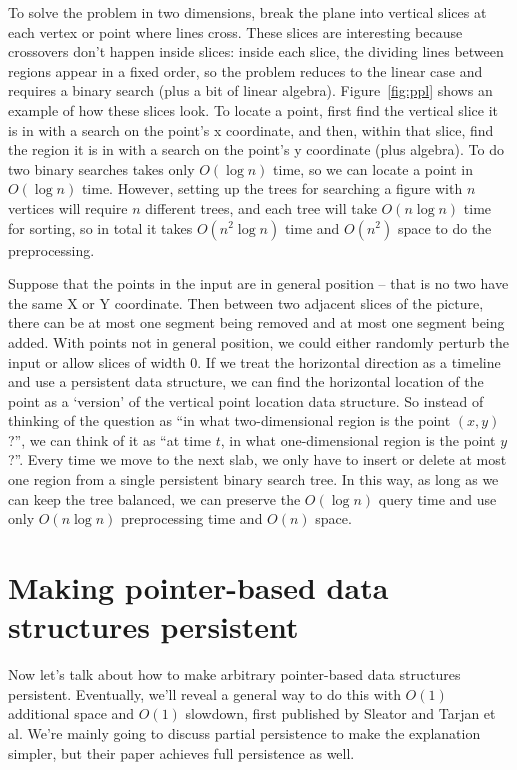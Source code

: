 \documentclass{article}
\begin{document}
To solve the problem in two dimensions, break the plane into vertical
slices at each vertex or point where lines cross. These slices are
interesting because crossovers don't happen inside slices: inside each
slice, the dividing lines between regions appear in a fixed order, so
the problem reduces to the linear case and requires a binary search
(plus a bit of linear algebra).  Figure~\ref{fig:ppl} shows an example
of how these slices look. To locate a point, first find the vertical
slice it is in with a search on the point's x coordinate, and then,
within that slice, find the region it is in with a search on the
point's y coordinate (plus algebra). To do two binary searches takes
only $O(\log n)$ time, so we can locate a point in $ O(\log n)$ time.
However, setting up the trees for searching a figure with $n$ vertices
will require $n$ different trees, and each tree will take
$O(n\log n)$ time for sorting, so in total it takes $O(n^2 \log n)$ time and
$O(n^2)$ space to do the preprocessing.

Suppose that the points in the input are in general position -- that is 
no two have the same X or Y coordinate. Then between two adjacent slices
of the picture, there can be at most one segment being removed and at most
one segment being added. With points not in general position, we could either
randomly perturb the input or allow slices of width 0.
If we treat the horizontal direction as a timeline and
use a persistent data structure, we can find the horizontal location
of the point as a `version' of the vertical point location data
structure. So instead of thinking of the question as ``in what
two-dimensional region is the point $(x,y)$?'', we can think of it as
``at time $t$, in what one-dimensional region is the point $y$?''.
Every time we move to the next slab, we only have to insert or delete
at most one region from a single persistent binary search tree.  In
this way, as long as we can keep the tree balanced, we can preserve
the $O(\log n)$ query time and use only $O(n\log n)$ preprocessing
time and $O(n)$ space.



\section{Making pointer-based data structures persistent}

Now let's talk about how to make arbitrary pointer-based data structures
persistent. Eventually, we'll reveal a general way to do this with $O(1)$
additional space and $O(1)$ slowdown, first published by Sleator and Tarjan
et al. We're mainly going to discuss partial persistence to make the
explanation simpler, but their paper achieves full persistence as well.
\end{document}

